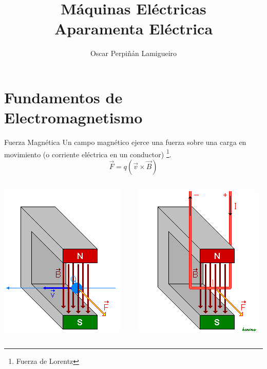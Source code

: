 \documentclass[xcolor={usenames,svgnames,dvipsnames}]{beamer}
\author{Oscar Perpiñán Lamigueiro}
\date{}
\title{Máquinas Eléctricas \\ Aparamenta Eléctrica}
\begin{document}
\maketitle

\section{Fundamentos de Electromagnetismo}
\label{sec:orge994ecc}

\begin{frame}[label={sec:orgb980748}]{Fuerza Magnética}
Un campo magnético ejerce una fuerza sobre una carga en movimiento (o corriente eléctrica en un conductor) \footnote{Fuerza de Lorentz}.
\[
\vec{F} = q (\vec{v} \times \vec{B})
\]

\begin{columns}
\begin{column}{0.5\columnwidth}
\begin{center}
\includegraphics[height=0.5\textheight]{figs/Fuerza_Lorentz.png}
\end{center}
\end{column}

\begin{column}{0.5\columnwidth}
\begin{center}
\includegraphics[height=0.5\textheight]{figs/Fuerza_Lorentz_Conductor.png}
\end{center}
\end{column}
\end{columns}
\end{frame}
\end{document}
